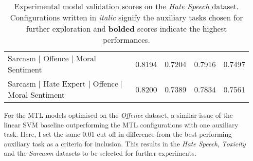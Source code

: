 \begin{table}[h]
{\begin{tabular}{l|cccc}
    Sarcasm | Offence | Moral Sentiment               & 0.8194          & 0.7204          & 0.7916          & 0.7497          \\
    Sarcasm | Hate Expert | Offence | Moral Sentiment & 0.8200          & 0.7389          & 0.7834          & 0.7561
  \end{tabular}%
  }
  \caption{Experimental model validation scores on the \textit{Hate Speech} dataset. Configurations written in \textit{italic} signify the auxiliary tasks chosen for further exploration and \textbf{bolded} scores indicate the highest performances.}
  \label{tab:mtl_dev_wh}
\end{table}

For the MTL models optimised on the \textit{Offence} dataset, a similar issue of the linear SVM baseline outperforming the MTL configurations with one auxiliary task.
Here, I set the same $0.01$ cut off in difference from the best performing auxiliary task as a criteria for inclusion.
This results in the \textit{Hate Speech}, \textit{Toxicity} and the \textit{Sarcasm} datasets to be selected for further experiments.

